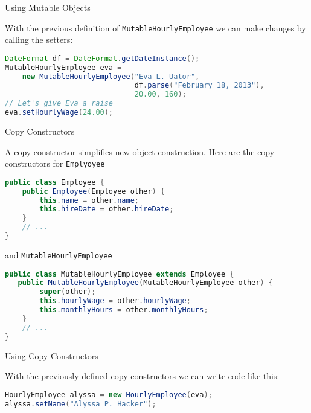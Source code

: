 \documentclass{beamer}
\begin{document}
\begin{frame}[fragile]{Using Mutable Objects}


With the previous definition of {\tt MutableHourlyEmployee} we can make changes by calling the setters:
\begin{lstlisting}[language=Java]
DateFormat df = DateFormat.getDateInstance();
MutableHourlyEmployee eva = 
    new MutableHourlyEmployee("Eva L. Uator",
                              df.parse("February 18, 2013"),
                              20.00, 160);
// Let's give Eva a raise
eva.setHourlyWage(24.00);
\end{lstlisting}


\end{frame}

\begin{frame}[fragile]{Copy Constructors}


A copy constructor simplifies new object construction.  Here are the copy constructors for {\tt Emplyoyee}
\begin{lstlisting}[language=Java]
public class Employee {
    public Employee(Employee other) {
        this.name = other.name;
        this.hireDate = other.hireDate;
    }
    // ...
}
\end{lstlisting}
and {\tt MutableHourlyEmployee}
\begin{lstlisting}[language=Java]
public class MutableHourlyEmployee extends Employee {
   public MutableHourlyEmployee(MutableHourlyEmployee other) {
        super(other);
        this.hourlyWage = other.hourlyWage;
        this.monthlyHours = other.monthlyHours;
    }
    // ...
}
\end{lstlisting}


\end{frame}

\begin{frame}[fragile]{Using Copy Constructors}


With the previously defined copy constructors we can write code like this:
\begin{lstlisting}[language=Java]
HourlyEmployee alyssa = new HourlyEmployee(eva);
alyssa.setName("Alyssa P. Hacker");
\end{lstlisting}



\end{frame}
\end{document}
